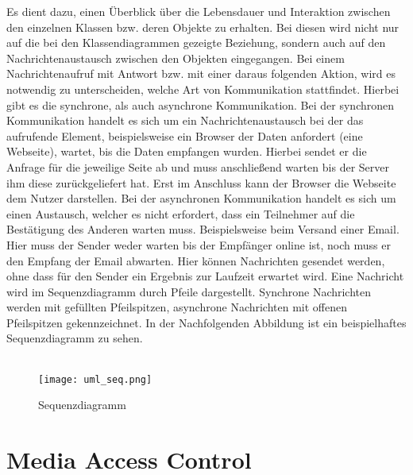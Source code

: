 Es dient dazu, einen Überblick über die Lebensdauer und Interaktion zwischen den einzelnen Klassen bzw. deren Objekte zu erhalten.
Bei diesen wird nicht nur auf die bei den Klassendiagrammen gezeigte Beziehung, sondern auch auf den Nachrichtenaustausch zwischen den Objekten eingegangen.
Bei einem Nachrichtenaufruf mit Antwort bzw. mit einer daraus folgenden Aktion, wird es notwendig zu unterscheiden, welche Art von Kommunikation stattfindet. Hierbei gibt es die synchrone, als auch asynchrone Kommunikation.
Bei der synchronen Kommunikation handelt es sich um ein Nachrichtenaustausch bei der das aufrufende Element, beispielsweise ein Browser der Daten anfordert (eine Webseite), wartet, bis die Daten empfangen wurden. Hierbei sendet er die Anfrage für die jeweilige Seite ab und muss anschließend warten bis der Server ihm diese zurückgeliefert hat. Erst im Anschluss kann der Browser die Webseite dem Nutzer darstellen.
Bei der asynchronen Kommunikation handelt es sich um einen Austausch, welcher es nicht erfordert, dass ein Teilnehmer auf die Bestätigung des Anderen warten muss. Beispielsweise beim Versand einer Email. Hier muss der Sender weder warten bis der Empfänger online ist, noch muss er den Empfang der Email abwarten. Hier können Nachrichten gesendet werden, ohne dass für den Sender ein Ergebnis zur Laufzeit erwartet wird.
Eine Nachricht wird im Sequenzdiagramm durch Pfeile dargestellt. Synchrone Nachrichten werden mit gefüllten Pfeilspitzen, asynchrone Nachrichten mit offenen Pfeilspitzen gekennzeichnet. In der Nachfolgenden Abbildung ist ein beispielhaftes Sequenzdiagramm zu sehen.\\
\\
\begin{figure}[H]
\centering
\texttt{[image: uml\_seq.png]}
\caption{Sequenzdiagramm}
\label{fig:show_s1_s2_p1_n1}
\end{figure}

\section{Media Access Control}
\label{sec:mac}

